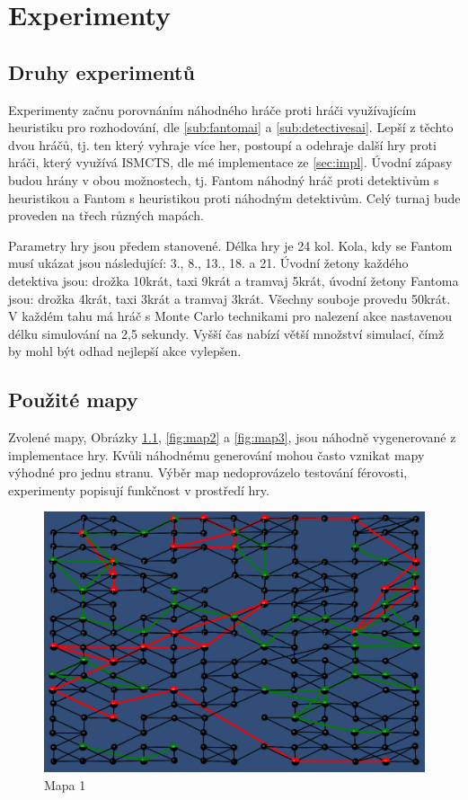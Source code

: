 \chapter{Experimenty}

\section{Druhy experimentů}

Experimenty začnu porovnáním náhodného hráče proti hráči využívajícím heuristiku pro rozhodování, dle \cref{sub:fantomai} a \cref{sub:detectivesai}. Lepší z těchto dvou hráčů, tj. ten který vyhraje více her, postoupí a odehraje další hry proti hráči, který využívá ISMCTS, dle mé implementace ze \cref{sec:impl}. Úvodní zápasy budou hrány v obou možnostech, tj. Fantom náhodný hráč proti detektivům s heuristikou a Fantom s heuristikou proti náhodným detektivům. Celý turnaj bude proveden na třech různých mapách.

Parametry hry jsou předem stanovené. Délka hry je 24 kol. Kola, kdy se Fantom musí ukázat jsou následující: 3., 8., 13., 18. a 21. Úvodní žetony každého detektiva jsou: drožka 10krát, taxi 9krát a tramvaj 5krát, úvodní žetony Fantoma jsou: drožka 
4krát, taxi 3krát a tramvaj 3krát. Všechny souboje provedu 50krát. V každém tahu má hráč s Monte Carlo technikami pro nalezení akce nastavenou délku simulování na 2,5 sekundy. Vyšší čas nabízí větší množství simulací, čímž by mohl být odhad nejlepší akce vylepšen. 

\section{Použité mapy}

Zvolené mapy, Obrázky \ref{fig:map1}, \ref{fig:map2} a \ref{fig:map3}, jsou náhodně vygenerované z implementace hry. Kvůli náhodnému generování mohou často vznikat mapy výhodné pro jednu stranu. Výběr map nedoprovázelo testování férovosti, experimenty popisují funkčnost v prostředí hry. 

\begin{figure}[h]
  \centering
  \includegraphics[width=1\textwidth]{mapa1.png}
  \caption{Mapa 1}
  \label{fig:map1}
\end{figure}

